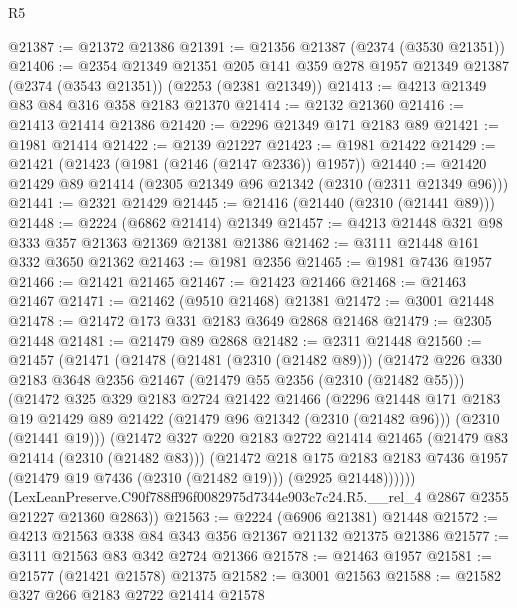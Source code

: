 \begin{lexlean}{R5}
\begin{coremodule}
@21387 := @21372 @21386
@21391 := @21356 @21387 (@2374 (@3530 @21351))
@21406 := @2354
    @21349
    @21351
    @205
    @141
    @359
    @278
    @1957
    @21349
    @21387
    (@2374 (@3543 @21351))
    (@2253 (@2381 @21349))
@21413 := @4213 @21349 @83 @84 @316 @358 @2183 @21370
@21414 := @2132 @21360
@21416 := @21413 @21414 @21386
@21420 := @2296 @21349 @171 @2183 @89
@21421 := @1981 @21414
@21422 := @2139 @21227
@21423 := @1981 @21422
@21429 := @21421 (@21423 (@1981 (@2146 (@2147 @2336)) @1957))
@21440 := @21420 @21429 @89 @21414 (@2305 @21349 @96 @21342 (@2310 (@2311 @21349 @96)))
@21441 := @2321 @21429
@21445 := @21416 (@21440 (@2310 (@21441 @89)))
@21448 := @2224 (@6862 @21414) @21349
@21457 := @4213 @21448 @321 @98 @333 @357 @21363 @21369 @21381 @21386
@21462 := @3111 @21448 @161 @332 @3650 @21362
@21463 := @1981 @2356
@21465 := @1981 @7436 @1957
@21466 := @21421 @21465
@21467 := @21423 @21466
@21468 := @21463 @21467
@21471 := @21462 (@9510 @21468) @21381
@21472 := @3001 @21448
@21478 := @21472 @173 @331 @2183 @3649 @2868 @21468
@21479 := @2305 @21448
@21481 := @21479 @89 @2868
@21482 := @2311 @21448
@21560 := @21457
    (@21471
      (@21478
        (@21481 (@2310 (@21482 @89)))
        (@21472
          @226
          @330
          @2183
          @3648
          @2356
          @21467
          (@21479 @55 @2356 (@2310 (@21482 @55)))
          (@21472
            @325
            @329
            @2183
            @2724
            @21422
            @21466
            (@2296
              @21448
              @171
              @2183
              @19
              @21429
              @89
              @21422
              (@21479 @96 @21342 (@2310 (@21482 @96)))
              (@2310 (@21441 @19)))
            (@21472
              @327
              @220
              @2183
              @2722
              @21414
              @21465
              (@21479 @83 @21414 (@2310 (@21482 @83)))
              (@21472
                @218
                @175
                @2183
                @2183
                @7436
                @1957
                (@21479 @19 @7436 (@2310 (@21482 @19)))
                (@2925 @21448))))))
      (LexLeanPreserve.C90f788ff96f0082975d7344e903c7c24.R5.__rel_4
        @2867
        @2355
        @21227
        @21360
        @2863))
@21563 := @2224 (@6906 @21381) @21448
@21572 := @4213 @21563 @338 @84 @343 @356 @21367 @21132 @21375 @21386
@21577 := @3111 @21563 @83 @342 @2724 @21366
@21578 := @21463 @1957
@21581 := @21577 (@21421 @21578) @21375
@21582 := @3001 @21563
@21588 := @21582 @327 @266 @2183 @2722 @21414 @21578

\end{coremodule}
\end{lexlean}
